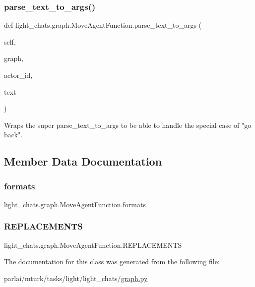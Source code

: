 \subsubsection{\texorpdfstring{parse\+\_\+text\+\_\+to\+\_\+args()}{parse\_text\_to\_args()}}
{\footnotesize\ttfamily def light\+\_\+chats.\+graph.\+Move\+Agent\+Function.\+parse\+\_\+text\+\_\+to\+\_\+args (\begin{DoxyParamCaption}\item[{}]{self,  }\item[{}]{graph,  }\item[{}]{actor\+\_\+id,  }\item[{}]{text }\end{DoxyParamCaption})}

\begin{DoxyVerb}Wraps the super parse_text_to_args to be able to handle the special case of "go
back".
\end{DoxyVerb}
 

\subsection{Member Data Documentation}
\mbox{\label{classlight__chats_1_1graph_1_1MoveAgentFunction_af70bc014668a0da4126b2edb64f71d98}} 
\subsubsection{\texorpdfstring{formats}{formats}}
{\footnotesize\ttfamily light\+\_\+chats.\+graph.\+Move\+Agent\+Function.\+formats}

\mbox{\label{classlight__chats_1_1graph_1_1MoveAgentFunction_a7757c7aebcb3df4202c8aebdea0746cf}} 
\subsubsection{\texorpdfstring{R\+E\+P\+L\+A\+C\+E\+M\+E\+N\+TS}{REPLACEMENTS}}
{\footnotesize\ttfamily light\+\_\+chats.\+graph.\+Move\+Agent\+Function.\+R\+E\+P\+L\+A\+C\+E\+M\+E\+N\+TS\hspace{0.3cm}{\ttfamily [static]}}



The documentation for this class was generated from the following file\+:\begin{DoxyCompactItemize}
\item 
parlai/mturk/tasks/light/light\+\_\+chats/\hyperlink{parlai_2mturk_2tasks_2light_2light__chats_2graph_8py}{graph.\+py}\end{DoxyCompactItemize}
